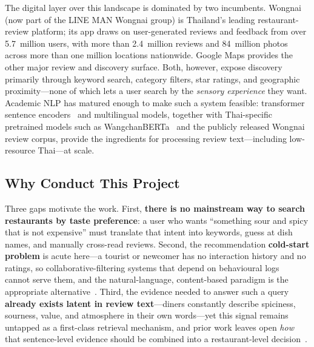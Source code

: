 The digital layer over this landscape is dominated by two incumbents. Wongnai (now
part of the LINE MAN Wongnai group) is Thailand's leading restaurant-review platform;
its app draws on user-generated reviews and feedback from over 5.7~million users,
with more than 2.4~million reviews and 84~million photos across more than one million
locations nationwide. Google Maps provides the other major review and discovery
surface. Both, however, expose discovery primarily through keyword search, category
filters, star ratings, and geographic proximity---none of which lets a user search by
the \emph{sensory experience} they want. Academic NLP has matured enough to make such
a system feasible: transformer sentence encoders~\cite{devlin2019bert,reimers2019sbert}
and multilingual models, together with Thai-specific pretrained models such as
WangchanBERTa~\cite{lowphansirikul2021wangchanberta} and the publicly released Wongnai
review corpus, provide the ingredients for processing review text---including
low-resource Thai---at scale.

\subsection{Why Conduct This Project}
Three gaps motivate the work. First, \textbf{there is no mainstream way to search
restaurants by taste preference}: a user who wants ``something sour and spicy that is
not expensive'' must translate that intent into keywords, guess at dish names, and
manually cross-read reviews. Second, the recommendation \textbf{cold-start problem} is
acute here---a tourist or newcomer has no interaction history and no ratings, so
collaborative-filtering systems that depend on behavioural logs~\cite{koren2009mf}
cannot serve them, and the natural-language, content-based paradigm is the appropriate
alternative~\cite{gao2021crs,kostric2024usage}. Third, the evidence needed to answer
such a query \textbf{already exists latent in review text}---diners constantly describe
spiciness, sourness, value, and atmosphere in their own words---yet this signal remains
untapped as a first-class retrieval mechanism, and prior work leaves open \emph{how}
that sentence-level evidence should be combined into a restaurant-level
decision~\cite{rird2023,zhang2020explainable}.

